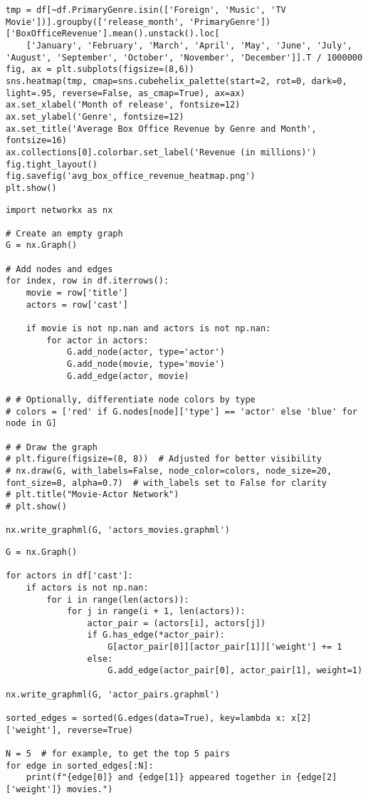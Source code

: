 \begin{lstlisting}
tmp = df[~df.PrimaryGenre.isin(['Foreign', 'Music', 'TV Movie'])].groupby(['release_month', 'PrimaryGenre'])['BoxOfficeRevenue'].mean().unstack().loc[
    ['January', 'February', 'March', 'April', 'May', 'June', 'July', 'August', 'September', 'October', 'November', 'December']].T / 1000000
fig, ax = plt.subplots(figsize=(8,6))
sns.heatmap(tmp, cmap=sns.cubehelix_palette(start=2, rot=0, dark=0, light=.95, reverse=False, as_cmap=True), ax=ax)
ax.set_xlabel('Month of release', fontsize=12)
ax.set_ylabel('Genre', fontsize=12)
ax.set_title('Average Box Office Revenue by Genre and Month', fontsize=16)
ax.collections[0].colorbar.set_label('Revenue (in millions)')
fig.tight_layout()
fig.savefig('avg_box_office_revenue_heatmap.png')
plt.show()
\end{lstlisting}

\begin{lstlisting}
import networkx as nx

# Create an empty graph
G = nx.Graph()

# Add nodes and edges
for index, row in df.iterrows():
    movie = row['title']
    actors = row['cast']
   
    if movie is not np.nan and actors is not np.nan:
        for actor in actors:
            G.add_node(actor, type='actor')
            G.add_node(movie, type='movie')
            G.add_edge(actor, movie)
            
# # Optionally, differentiate node colors by type
# colors = ['red' if G.nodes[node]['type'] == 'actor' else 'blue' for node in G]

# # Draw the graph
# plt.figure(figsize=(8, 8))  # Adjusted for better visibility
# nx.draw(G, with_labels=False, node_color=colors, node_size=20, font_size=8, alpha=0.7)  # with_labels set to False for clarity
# plt.title("Movie-Actor Network")
# plt.show()

nx.write_graphml(G, 'actors_movies.graphml')

\end{lstlisting}

\begin{lstlisting}
G = nx.Graph()

for actors in df['cast']:
    if actors is not np.nan:
        for i in range(len(actors)):
            for j in range(i + 1, len(actors)):
                actor_pair = (actors[i], actors[j])
                if G.has_edge(*actor_pair):
                    G[actor_pair[0]][actor_pair[1]]['weight'] += 1
                else:
                    G.add_edge(actor_pair[0], actor_pair[1], weight=1)
                    
nx.write_graphml(G, 'actor_pairs.graphml')

sorted_edges = sorted(G.edges(data=True), key=lambda x: x[2]['weight'], reverse=True)

N = 5  # for example, to get the top 5 pairs
for edge in sorted_edges[:N]:
    print(f"{edge[0]} and {edge[1]} appeared together in {edge[2]['weight']} movies.")
\end{lstlisting}

